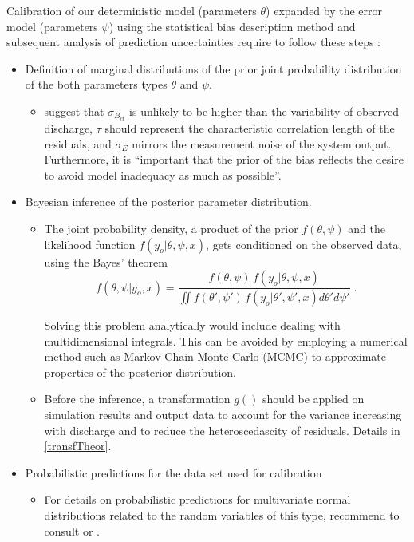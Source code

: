 \documentclass{ctuthesis}\usepackage[]{graphicx}\usepackage[]{color}
\begin{document}
Calibration of our deterministic model (parameters $\theta$) expanded by the error model (parameters $\psi$) using the statistical bias description method and subsequent analysis of prediction uncertainties require to follow these steps \citep{giudice2013improving}:
\begin{itemize}
	\item  Definition of marginal distributions of the prior joint probability distribution of the both parameters types $\theta$ and $\psi$. 
        \begin{itemize}
                \item \cite{giudice2013improving} suggest that $\sigma_{B_{ct}}$ is unlikely to be higher than the variability of observed discharge, $\tau$ should represent the characteristic correlation length of the residuals, and  $\sigma_E$ mirrors the measurement noise of the system output. Furthermore, it is \enquote{important that the prior of the bias reflects the desire to avoid model inadequacy as much as possible}. 
        \end{itemize}

	\item  Bayesian inference of the posterior parameter distribution.
	\begin{itemize}
                \item	The joint probability density, a product of the prior $f(\theta, \psi)$ and the likelihood function $f(y_o | \theta, \psi, x)$, gets conditioned on the observed data, using the Bayes' theorem
                \begin{equation}
f (\theta, \psi | y_o, x) = \frac{ f(\theta, \psi) \, f(y_o | \theta, \psi, x) } { \iint f(\theta' , \psi') \, f(y_o | \theta', \psi', x) d\theta' d\psi'} \; .
                \end{equation}

Solving this problem analytically would include dealing with multidimensional integrals. This can be avoided by employing a numerical method such as Markov Chain Monte Carlo (MCMC) to approximate properties of the posterior distribution.

        \item Before the inference, a transformation $g()$  should be applied on simulation results and output data to account for the variance increasing with discharge and to reduce the heteroscedascity of residuals. Details in \ref{transfTheor}.
        \end{itemize}
        
	\item  Probabilistic predictions for the data set used for calibration
	\begin{itemize}
                \item For details on probabilistic predictions for multivariate normal distributions related to the random variables of this type, \cite{giudice2013improving} recommend to consult \cite{kendall1994vol} or \cite{kollo2006advanced}.
        \end{itemize}
	

\end{itemize}
\end{document}
